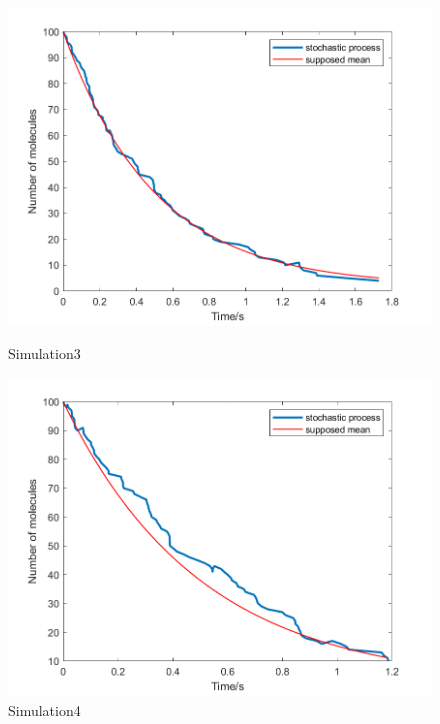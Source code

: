 \documentclass{article}
\begin{document}
\begin{figure}[htbp]
    \centering
    \begin{minipage}{0.45\linewidth}
        \centering
        \includegraphics[width=\linewidth]{graph/c3.png}
        \caption{Simulation3}
        \label{c3}
    \end{minipage}
    \hfill
    \begin{minipage}{0.45\linewidth}
        \centering
        \includegraphics[width=\linewidth]{graph/c4.png}
        \caption{Simulation4}
        \label{c4}
    \end{minipage}
\end{figure}
\end{document}
